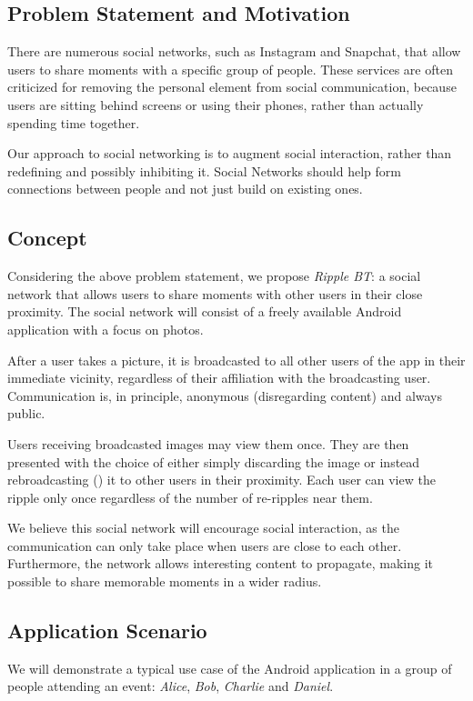 \documentclass{report}
\begin{document}
\subsection{Problem Statement and Motivation}
There are numerous social networks, such as Instagram and Snapchat, that allow users to share moments with a specific group of people.
These services are often criticized for removing the personal element from social communication, because users are sitting behind screens or using their phones, rather than actually spending time together.

Our approach to social networking is to augment social interaction, rather than redefining and possibly inhibiting it. Social Networks should help form connections between people and not just build on existing ones.

\subsection{Concept}
Considering the above problem statement, we propose \textit{Ripple BT}: a social network that allows users to share moments with other users in their close proximity. The social network will consist of a freely available Android application with a focus on photos.

After a user takes a picture, it is broadcasted to all other users of the app in their immediate vicinity, regardless of their affiliation with the broadcasting user. Communication is, in principle, anonymous (disregarding content) and always public.

Users receiving broadcasted images may view them once. They are then presented with the choice of either simply discarding the image or instead rebroadcasting () it to other users in their proximity.
Each user can view the ripple only once regardless of the number of re-ripples near them.

We believe this social network will encourage social interaction, as the communication can only take place when users are close to each other. Furthermore, the network allows interesting content to propagate, making it possible to share memorable moments in a wider radius.

\subsection{Application Scenario}
We will demonstrate a typical use case of the Android application in a group of people attending an event: \textit{Alice}, \textit{Bob}, \textit{Charlie} and \textit{Daniel}.
\end{document}
